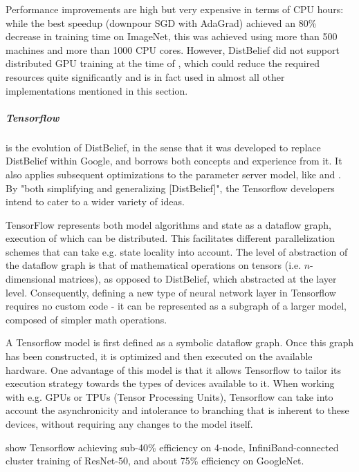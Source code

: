 Performance improvements are high but very expensive in terms of CPU hours: while the best speedup (downpour SGD with AdaGrad) achieved an 80\% decrease in training time on ImageNet, this was achieved using more than 500 machines and more than 1000 CPU cores. However, DistBelief did not support distributed GPU training at the time of \citet{DistBelief2012}, which could reduce the required resources quite significantly and is in fact used in almost all other implementations mentioned in this section.

\subparagraph{Tensorflow \citep{Tensorflow2015}\citep{Tensorflow2016}}

is the evolution of DistBelief, in the sense that it was developed to replace DistBelief within Google, and borrows both concepts and experience from it. It also applies subsequent optimizations to the parameter server model, like \citet{Chilimbi14} and \citet{Li2014Comms}\citep{Li2014Scaling}. By "both simplifying and generalizing [DistBelief]"\citep{Tensorflow2016}, the Tensorflow developers intend to cater to a wider variety of ideas.

TensorFlow represents both model algorithms and state as a dataflow graph, execution of which can be distributed. This facilitates different parallelization schemes that can take e.g. state locality into account. The level of abstraction of the dataflow graph is that of mathematical operations on tensors (i.e. $n$-dimensional matrices), as opposed to DistBelief, which abstracted at the layer level. Consequently, defining a new type of neural network layer in Tensorflow requires no custom code - it can be represented as a subgraph of a larger model, composed of simpler math operations.

A Tensorflow model is first defined as a symbolic dataflow graph. Once this graph has been constructed, it is optimized and then executed on the available hardware. One advantage of this model is that it allows Tensorflow to tailor its execution strategy towards the types of devices available to it. When working with e.g. GPUs or TPUs (Tensor Processing Units\citep{TPU2017}), Tensorflow can take into account the asynchronicity and intolerance to branching that is inherent to these devices, without requiring any changes to the model itself.

\citet{Shaohuai2017} show Tensorflow achieving sub-40\% efficiency on 4-node, InfiniBand-connected cluster training of ResNet-50\citet{He2015}, and about 75\% efficiency on GoogleNet\citep{Szegedy2014}. 


